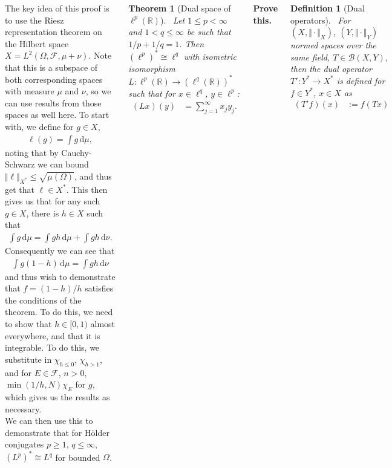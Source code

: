 \documentclass{tikzposter} %
\newcommand{\rightopen}[2]{\ensuremath{[#1,#2)}}
\newtheorem{theorem}{Theorem}
\newtheorem{definition}{Definition}
\begin{document}
\begin{columns}
{    The key idea of this proof is to use the Riesz representation theorem on the Hilbert space $X = L^{2}(\Omega, \mathcal{F}, \mu+\nu)$. Note that this is a subspace of both corresponding spaces with measure $\mu$ and $\nu$, so we can use results from those spaces as well here. To start with, we define for $g \in X$,
    \begin{align*}
      \ell(g) = \int g \, \mathrm{d}\mu,
    \end{align*}
    noting that by Cauchy-Schwarz we can bound $\Vert \ell \Vert_{X^{*}} \le \sqrt{\mu(\Omega)}$, and thus get that $\ell \in X^{*}$. This then gives us that for any such $g \in X$, there is $h \in X$ such that
    \begin{align*}
      \int g \, \mathrm{d}\mu = \int gh \, \mathrm{d}\mu + \int gh \, \mathrm{d}\nu.
    \end{align*}
    Consequently we can see that
    \begin{align*}
      \int g(1-h) \, \mathrm{d}\mu = \int gh \, \mathrm{d}\nu
    \end{align*}
    and thus wish to demonstrate that $f = (1-h)/h$ satisfies the conditions of the theorem. To do this, we need to show that $h \in \rightopen{0}{1}$ almost everywhere, and that it is integrable. To do this, we substitute in $\chi_{h \le 0}$, $\chi_{h > 1}$, and for $E \in \mathcal{F}$, $n > 0$, $\min(1/h, N)\chi_{E}$ for $g$, which gives us the results as necessary. \\

    We can then use this to demonstrate that for H\"{o}lder conjugates $p \ge 1$, $q \le \infty$, $(L^{p})^{*} \cong L^{q}$ for bounded $\Omega$.

    \begin{theorem}[Dual space of $\ell^{p}(\mathbb{R})$]
    \ Let $1 \le p < \infty$ and $1 < q \le \infty$ be such that $1/p + 1/q = 1$. Then $(\ell^{p})^{*} \cong \ell^{q}$ with isometric isomorphism $L : \ell^{p}(\mathbb{R}) \to (\ell^{q}(\mathbb{R}))^{*}$ such that for $x \in \ell^{q}$, $y \in \ell^{p}$:
    \begin{align*}
      (Lx)(y) &= \sum_{j=1}^{\infty} x_{j}y_{j}.
    \end{align*}
    \end{theorem}
    \hphantom{}

    \textbf{Prove this.} \\

      \begin{definition}[Dual operators]
        \ For $(X, \Vert \cdot \Vert_{X})$, $(Y, \Vert \cdot \Vert_{Y})$ normed spaces over the same field, $T \in \mathcal{B}(X,Y)$, then the dual operator $T' : Y^{*} \to X^{*}$ is defined for $f \in Y^{*}$, $x \in X$ as
        \begin{align*}
          (T'f)(x) &:= f(Tx)
        \end{align*}
      \end{definition}
      \hphantom{}

}
\end{columns}
\end{document}
